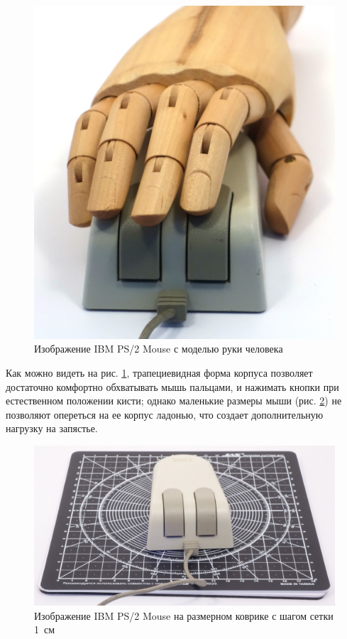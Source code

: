 \documentclass[11pt, a4paper]{article}
\begin{document}
\begin{figure}[h]
    \centering
    \includegraphics[scale=0.4]{1987_ibm_ps2_mouse/num3.JPG}
    \caption{Изображение IBM PS/2 Mouse с моделью руки человека}
    \label{fig:IMBPS2Hand}
\end{figure}

Как можно видеть на рис. \ref{fig:IMBPS2Hand}, трапециевидная форма корпуса позволяет достаточно комфортно обхватывать мышь пальцами, и нажимать кнопки при естественном положении кисти; однако маленькие размеры мыши (рис. \ref{fig:IBMPS2Size}) не позволяют опереться на ее корпус ладонью, что создает дополнительную нагрузку на запястье.

\begin{figure}[h]
    \centering
    \includegraphics[scale=0.34]{1987_ibm_ps2_mouse/num4.jpg}
    \caption{Изображение IBM PS/2 Mouse на размерном коврике с шагом сетки 1~см}
    \label{fig:IBMPS2Size}
\end{figure}
\end{document}
